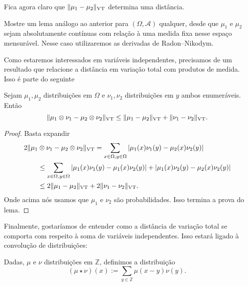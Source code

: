 \begin{topics}
Fica agora claro que $\lVert \mu_1 - \mu_2 \rVert_{\operatorname{VT}}$ determina uma distância.

\begin{exercise}
Mostre um lema análogo ao anterior para $(\Omega, \mathcal{A})$ qualquer, desde que $\mu_1$ e $\mu_2$ sejam absolutamente contínuas com relação à uma medida fixa nesse espaço mensurável. Nesse caso utilizaremos as derivadas de Radon–Nikodym.
\end{exercise}

Como estaremos interessados em variáveis independentes, precisamos de um resultado que relacione a distância em variação total com produtos de medida. Isso é parte do seguinte

\begin{lemma}
\label{l:vt_produto}
Sejam $\mu_1, \mu_2$ distribuições em $\Omega$ e $\nu_1, \nu_2$ distribuições em $y$ ambos enumeráveis. Então
\begin{equation}
  \lVert \mu_1 \otimes \nu_1 - \mu_2 \otimes \nu_2 \rVert_{\operatorname{VT}} \leq \lVert \mu_1 - \mu_2 \rVert_{\operatorname{VT}} + \lVert \nu_1 - \nu_2 \rVert_{\operatorname{VT}}.
\end{equation}
\end{lemma}

\begin{proof}
Basta expandir
\begin{equation}
  \begin{split}
    2\lVert \mu_1 & \otimes \nu_1 - \mu_2 \otimes \nu_2 \rVert_{\operatorname{VT}} = \sum_{x \in \Omega, y \in \Omega} |\mu_1(x)\nu_1(y) - \mu_2(x)\nu_2(y)|\\
    & \leq \sum_{x \in \Omega, y \in \Omega} |\mu_1(x)\nu_1(y) - \mu_1(x)\nu_2(y)| + |\mu_1(x)\nu_2(y) - \mu_2(x)\nu_2(y)|\\
    & \leq 2\lVert \mu_1 - \mu_2 \rVert_{\operatorname{VT}} + 2\lVert \nu_1 - \nu_2 \rVert_{\operatorname{VT}}.
  \end{split}
\end{equation}
Onde acima nós usamos que $\mu_1$ e $\nu_2$ são probabilidades. Isso termina a prova do lema.
\end{proof}

Finalmente, gostaríamos de entender como a distância de variação total se comporta com respeito à soma de variáveis independentes.
Isso estará ligado à convolução de distribuições:

\begin{definition}
Dadas, $\mu$ e $\nu$ distribuições em $\mathbb{Z}$, definimos a distribuição
\begin{equation}
  (\mu \star \nu)(x) := \sum_{y \in \mathbb{Z}} \mu(x-y) \nu(y).
\end{equation}
\end{definition}


\end{topics}
